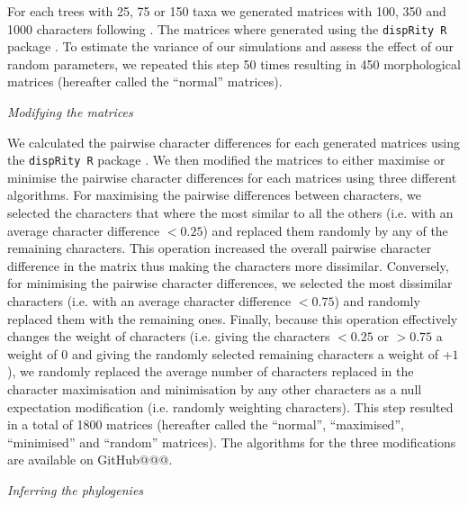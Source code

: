 \documentclass[12pt,letterpaper]{article}
\renewcommand{\subsection}[1]{%
\bigskip
\begin{center}
\begin{large}
\normalfont\itshape #1
\end{large}
\end{center}}
\begin{document}
For each trees with 25, 75 or 150 taxa we generated matrices with 100, 350 and 1000 characters following \cite{OReilly20160081}.
The matrices where generated using the \texttt{dispRity R} package \citep[][; \url{https://github.com/TGuillerme/dispRity}]{thomas_guillerme_2016_55646}.
To estimate the variance of our simulations and assess the effect of our random parameters, we repeated this step 50 times resulting in 450 morphological matrices (hereafter called the ``normal'' matrices).

\subsection{Modifying the matrices}

We calculated the pairwise character differences for each generated matrices using the \texttt{dispRity R} package \citep{thomas_guillerme_2016_55646}. %
We then modified the matrices to either maximise or minimise the pairwise character differences for each matrices using three different algorithms.
For maximising the pairwise differences between characters, we selected the characters that where the most similar to all the others (i.e. with an average character difference $<$$0.25$) and replaced them randomly by any of the remaining characters.
This operation increased the overall pairwise character difference in the matrix thus making the characters more dissimilar.
Conversely, for minimising the pairwise character differences, we selected the most dissimilar characters (i.e. with an average character difference $<$$0.75$) and randomly replaced them with the remaining ones.
Finally, because this operation effectively changes the weight of characters (i.e. giving the characters $<$$0.25$ or $>$$0.75$ a weight of $0$ and giving the randomly selected remaining characters a weight of +$1$), we randomly replaced the average number of characters replaced in the character maximisation and minimisation by any other characters as a null expectation modification (i.e. randomly weighting characters).
This step resulted in a total of 1800 matrices (hereafter called the ``normal'', ``maximised'', ``minimised'' and ``random'' matrices).
The algorithms for the three modifications are available on GitHub@@@. %

\subsection{Inferring the phylogenies}
\end{document}
